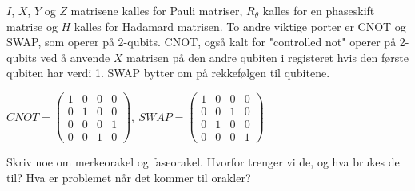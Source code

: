         $I$, $X$, $Y$ og $Z$ matrisene kalles for Pauli matriser, $R_\theta$ kalles for en phaseskift matrise og $H$ kalles for Hadamard matrisen. To andre viktige porter er CNOT og SWAP, som operer på 2-qubits. CNOT, også kalt for "controlled not" operer på 2-qubits ved å anvende $X$ matrisen på den andre qubiten i registeret hvis den første qubiten har verdi 1. SWAP bytter om på rekkefølgen til qubitene.
        \begin{center}
            \begin{math}
                CNOT = \begin{pmatrix}
                    1 & 0 & 0 & 0 \\
                    0 & 1 & 0 & 0 \\
                    0 & 0 & 0 & 1 \\
                    0 & 0 & 1 & 0
                \end{pmatrix},\ SWAP = \begin{pmatrix}
                    1 & 0 & 0 & 0 \\
                    0 & 0 & 1 & 0 \\
                    0 & 1 & 0 & 0 \\
                    0 & 0 & 0 & 1
                \end{pmatrix}
            \end{math}
        \end{center}

        Skriv noe om merkeorakel og faseorakel. Hvorfor trenger vi de, og hva brukes de til? Hva er problemet når det kommer til orakler?